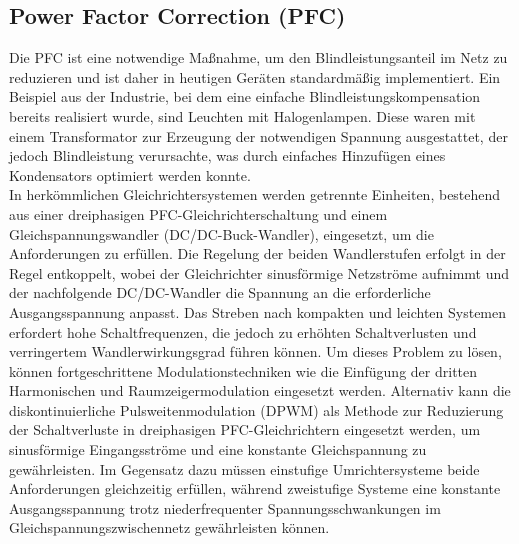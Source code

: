 		
		\subsection{Power Factor Correction (PFC)}
		Die \gls{PFC} ist eine notwendige Maßnahme, um den Blindleistungsanteil im Netz zu reduzieren und ist daher in heutigen Geräten standardmäßig implementiert. Ein Beispiel aus der Industrie, bei dem eine einfache Blindleistungskompensation bereits realisiert wurde, sind Leuchten mit Halogenlampen. Diese waren mit einem Transformator zur Erzeugung der notwendigen Spannung ausgestattet, der jedoch Blindleistung verursachte, was durch einfaches Hinzufügen eines Kondensators optimiert werden konnte. \\
		In herkömmlichen Gleichrichtersystemen werden getrennte Einheiten, bestehend aus einer dreiphasigen PFC-Gleichrichterschaltung und einem Gleichspannungswandler (DC/DC-Buck-Wandler), eingesetzt, um die Anforderungen zu erfüllen. Die Regelung der beiden Wandlerstufen erfolgt in der Regel entkoppelt, wobei der Gleichrichter sinusförmige Netzströme aufnimmt und der nachfolgende DC/DC-Wandler die Spannung an die erforderliche Ausgangsspannung anpasst. Das Streben nach kompakten und leichten Systemen erfordert hohe Schaltfrequenzen, die jedoch zu erhöhten Schaltverlusten und verringertem Wandlerwirkungsgrad führen können. Um dieses Problem zu lösen, können fortgeschrittene Modulationstechniken wie die Einfügung der dritten Harmonischen und Raumzeigermodulation eingesetzt werden. Alternativ kann die diskontinuierliche Pulsweitenmodulation (DPWM) als Methode zur Reduzierung der Schaltverluste in dreiphasigen PFC-Gleichrichtern eingesetzt werden, um sinusförmige Eingangsströme und eine konstante Gleichspannung zu gewährleisten. Im Gegensatz dazu müssen einstufige Umrichtersysteme beide Anforderungen gleichzeitig erfüllen, während zweistufige Systeme eine konstante Ausgangsspannung trotz niederfrequenter Spannungsschwankungen im Gleichspannungszwischennetz gewährleisten können.					
			
